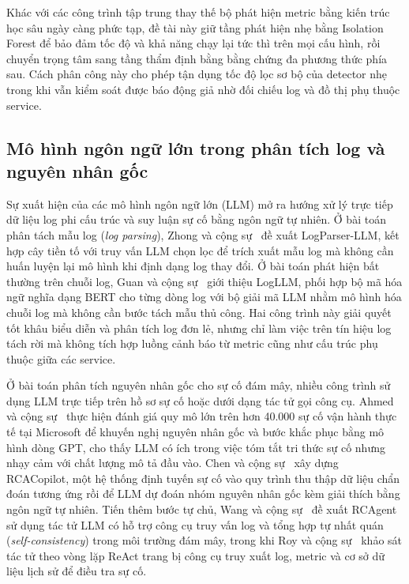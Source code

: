 Khác với các công trình tập trung thay thế bộ phát hiện metric bằng kiến trúc học sâu ngày càng phức tạp, đề tài này giữ tầng phát hiện nhẹ bằng Isolation Forest để bảo đảm tốc độ và khả năng chạy lại tức thì trên mọi cấu hình, rồi chuyển trọng tâm sang tầng thẩm định bằng bằng chứng đa phương thức phía sau. Cách phân công này cho phép tận dụng tốc độ lọc sơ bộ của detector nhẹ trong khi vẫn kiểm soát được báo động giả nhờ đối chiếu log và đồ thị phụ thuộc service.

\subsection{Mô hình ngôn ngữ lớn trong phân tích log và nguyên nhân gốc}
\label{sec:ch3-llm-log-rca}

Sự xuất hiện của các mô hình ngôn ngữ lớn (LLM) mở ra hướng xử lý trực tiếp dữ liệu log phi cấu trúc và suy luận sự cố bằng ngôn ngữ tự nhiên. Ở bài toán phân tách mẫu log (\emph{log parsing}), Zhong và cộng sự~\cite{zhong2024logparser} đề xuất LogParser-LLM, kết hợp cây tiền tố với truy vấn LLM chọn lọc để trích xuất mẫu log mà không cần huấn luyện lại mô hình khi định dạng log thay đổi. Ở bài toán phát hiện bất thường trên chuỗi log, Guan và cộng sự~\cite{guan2024logllm} giới thiệu LogLLM, phối hợp bộ mã hóa ngữ nghĩa dạng BERT cho từng dòng log với bộ giải mã LLM nhằm mô hình hóa chuỗi log mà không cần bước tách mẫu thủ công. Hai công trình này giải quyết tốt khâu biểu diễn và phân tích log đơn lẻ, nhưng chỉ làm việc trên tín hiệu log tách rời mà không tích hợp luồng cảnh báo từ metric cũng như cấu trúc phụ thuộc giữa các service.

Ở bài toán phân tích nguyên nhân gốc cho sự cố đám mây, nhiều công trình sử dụng LLM trực tiếp trên hồ sơ sự cố hoặc dưới dạng tác tử gọi công cụ. Ahmed và cộng sự~\cite{ahmed2023recommending} thực hiện đánh giá quy mô lớn trên hơn 40.000 sự cố vận hành thực tế tại Microsoft để khuyến nghị nguyên nhân gốc và bước khắc phục bằng mô hình dòng GPT, cho thấy LLM có ích trong việc tóm tắt tri thức sự cố nhưng nhạy cảm với chất lượng mô tả đầu vào. Chen và cộng sự~\cite{chen2024rcacopilot} xây dựng RCACopilot, một hệ thống định tuyến sự cố vào quy trình thu thập dữ liệu chẩn đoán tương ứng rồi để LLM dự đoán nhóm nguyên nhân gốc kèm giải thích bằng ngôn ngữ tự nhiên. Tiến thêm bước tự chủ, Wang và cộng sự~\cite{wang2024rcagent} đề xuất RCAgent sử dụng tác tử LLM có hỗ trợ công cụ truy vấn log và tổng hợp tự nhất quán (\emph{self-consistency}) trong môi trường đám mây, trong khi Roy và cộng sự~\cite{roy2024exploring} khảo sát tác tử theo vòng lặp ReAct trang bị công cụ truy xuất log, metric và cơ sở dữ liệu lịch sử để điều tra sự cố.

